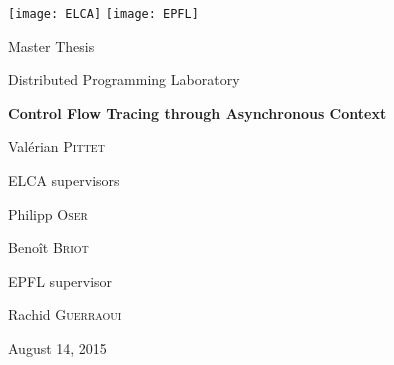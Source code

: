 \begin{titlepage}

  \newcommand{\rightside}[1]{
    \begin{flushright}
      \begin{minipage}[t]{0.48\textwidth}
        #1
      \end{minipage}
    \end{flushright}
  }


  \begin{center}
    \texttt{[image: ELCA]}
    \hfill
    \texttt{[image: EPFL]} \\[2cm]


    \rightside{
      \Large
      Master Thesis
      
      \small
      Distributed Programming Laboratory
    }


    \HRule
    \vspace{\baselineskip}

    \LARGE
    \textbf{Control Flow Tracing through Asynchronous Context}
    \normalsize
    \HRule
    
    \rightside{

      \vspace{1\baselineskip}

      \Large
      Val\'erian \textsc{Pittet}

      \vspace{2\baselineskip}

      \normalsize
      ELCA supervisors
      \smallskip
      \large
      \begin{list}{ }{}
      \item Philipp \textsc{Oser}
      \item Beno\^it \textsc{Briot}
      \end{list}
      
      \vspace{\baselineskip}

      \normalsize
      EPFL supervisor
      \smallskip
      \large
      \begin{list}{ }{}
      \item Rachid \textsc{Guerraoui}
      \end{list}


    }


    \vfill

    \normalsize
    August 14, 2015

  \end{center}

\end{titlepage}